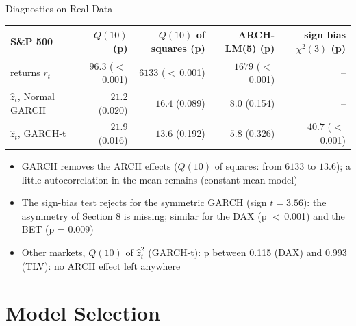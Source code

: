 \begin{frame}{Diagnostics on Real Data}
\itemsize{\footnotesize}
\begin{center}
\scriptsize
\begin{tabular}{lrrrr}
\toprule
S\&P 500 & $Q(10)$ (p) & $Q(10)$ of squares (p) & ARCH-LM(5) (p) & sign bias $\chi^2(3)$ (p) \\
\midrule
returns $r_t$ & $96.3$ ($<$\,0.001) & $6133$ ($<$\,0.001) & $1679$ ($<$\,0.001) & -- \\
$\hat z_t$, Normal GARCH & $21.2$ (0.020) & $16.4$ (0.089) & $8.0$ (0.154) & -- \\
$\hat z_t$, GARCH-t & $21.9$ (0.016) & $13.6$ (0.192) & $5.8$ (0.326) & $40.7$ ($<$\,0.001) \\
\bottomrule
\end{tabular}
\end{center}
\begin{itemize}
    \item GARCH removes the ARCH effects ($Q(10)$ of squares: from $6133$ to $13.6$); a little autocorrelation in the mean remains (constant-mean model)
    \item The sign-bias test rejects for the symmetric GARCH (sign $t = 3.56$): the asymmetry of Section 8 is missing; similar for the DAX (p $<$\,0.001) and the BET (p = 0.009)
    \item Other markets, $Q(10)$ of $\hat z_t^2$ (GARCH-t): p between 0.115 (DAX) and 0.993 (TLV): no ARCH effect left anywhere
\end{itemize}
\end{frame}


\section{Model Selection}

